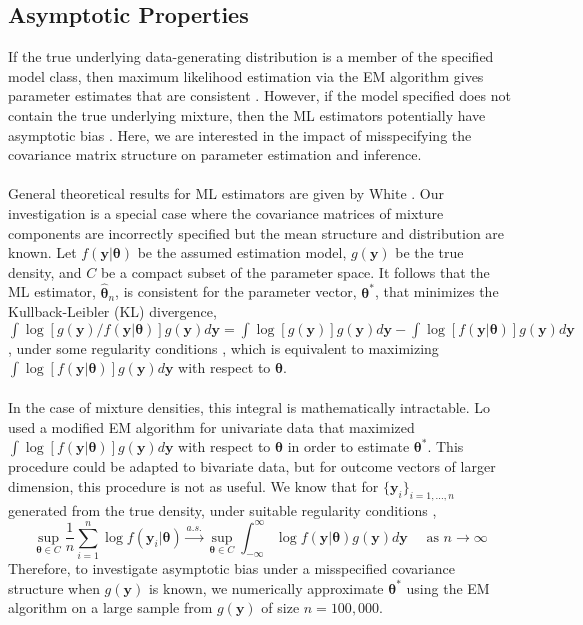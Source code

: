\documentclass[10pt]{article}
\newcommand{\B}[0]{\mathbf}
\newcommand{\bs}[0]{\boldsymbol}
\begin{document}
\subsection{Asymptotic Properties}
If the true underlying data-generating distribution is a member of the specified model class, then maximum likelihood estimation via the EM algorithm gives parameter estimates that are consistent  \cite{wald1949, lecam1953}. However, if the model specified does not contain the true underlying mixture, then the ML estimators potentially have asymptotic bias \cite{gray1994,lo2011}. Here, we are interested in the impact of misspecifying the covariance matrix structure on parameter estimation and inference.\\\\
General theoretical results for ML estimators are given by White \cite{white1982}. Our investigation is a special case where the covariance matrices of mixture components are incorrectly specified but the mean structure and distribution are known. Let $f(\B y|\bs \theta)$ be the assumed estimation model, $g(\B y)$ be the true density, and $C$ be a compact subset of the parameter space. It follows that the ML estimator, $\hat{\bs\theta}_{n}$, is consistent for the parameter vector, $\bs\theta^{*}$, that minimizes the Kullback-Leibler (KL) divergence, $\int \log[g(\B y)/f(\B y|\bs\theta)]g(\B y)d\B y=\int \log[g(\B y)]g(\B y)d\B y-\int \log[f(\B y|\bs\theta)]g(\B y)d\B y$, under some regularity conditions \cite{white1982}, which is equivalent to maximizing $\int \log[f(\B y|\bs\theta)]g(\B y)d\B y$ with respect to $\bs\theta$.  \\\\
In the case of mixture densities, this integral is mathematically intractable. Lo \cite{lo2011} used a modified EM algorithm for univariate data that maximized $\int \log[f(\B y|\bs\theta)]g(\B y)d\B y$  with respect to $\bs \theta$ in order to estimate $\bs\theta^{*}$. This procedure could be adapted to bivariate data, but for outcome vectors of larger dimension, this procedure is not as useful.  We know that for $\{\B y_i\}_{i=1,...,n}$ generated from the true density, under suitable regularity conditions \cite{jennrich1969},
$$\sup_{\bs \theta\in C}\frac{1}{n}\sum_{i=1}^{n} \log f(\B y_{i}|\bs \theta)\overset{a.s.}{\longrightarrow} \sup_{\bs \theta\in C} \int^{\infty}_{-\infty} \log f(\B y|\bs \theta)g(\B y)d\B y \quad \text{ as } n\rightarrow \infty$$
Therefore, to investigate asymptotic bias under a misspecified covariance structure when $g(\B y)$ is known, we numerically approximate $\bs\theta^{*}$ using the EM algorithm on a large sample from $g(\B y)$ of size $n=100,000$. \\\\
\end{document}
